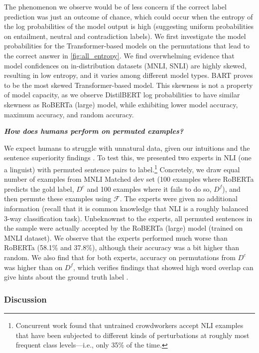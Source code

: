 \documentclass[12pt]{article}
\newcommand{\xit}[1]{{\noindent\textbf{\textit{#1}}}}
\begin{document}
The phenomenon we observe would be of less concern if the correct label prediction was just an outcome of chance, which could occur when the entropy of the log probabilities of the model output is high (suggesting uniform probabilities on entailment, neutral and contradiction labels). We first investigate the model probabilities for the Transformer-based models on the permutations that lead to the correct answer in \autoref{fig:all_entropy}. We find overwhelming evidence that model confidences on in-distribution datasets (MNLI, SNLI) are highly skewed, resulting in low entropy, and it varies among different model types. BART proves to be the most skewed Transformer-based model. This skewness is not a property of model capacity, as we observe DistilBERT log probabilities to have similar skewness as RoBERTa (large) model, while exhibiting lower model accuracy, maximum accuracy, and random accuracy.

\xit{How does humans perform on permuted examples?}

We expect humans to struggle with unnatural data, given our intuitions and the sentence superiority findings \cite{mollica-2020-composition}. To test this, we presented two experts in NLI (one a linguist) with permuted sentence pairs to label.\footnote{Concurrent work \cite{gupta-etal-2021-bert} found that untrained crowdworkers accept NLI examples that have been subjected to different kinds of perturbations at roughly most frequent class levels---i.e., only 35\% of the time.} Concretely, we draw equal number of examples from MNLI Matched dev set (100 examples where RoBERTa predicts the gold label, $D^c$ and 100 examples where it fails to do so, $D^f$), and then permute these examples using $\mathcal{F}$. The experts were given no additional information (recall that it is common knowledge that NLI is a roughly balanced 3-way classification task). Unbeknownst to the experts, all permuted sentences in the sample were actually accepted by the RoBERTa (large) model (trained on MNLI dataset). We observe that the experts performed much worse than RoBERTa (58.1\% and 37.8\%), although their accuracy was a bit higher than random. We also find that for both experts, accuracy on permutations from $D^c$ was higher than on $D^f$, which verifies findings that showed high word overlap can give hints about the ground truth label \citep{dasgupta-etal-2018-evaluating, poliak-etal-2018-hypothesis, gururangan-etal-2018-annotation, naik-etal-2019-exploring}.


\subsubsection{Discussion}
\end{document}
